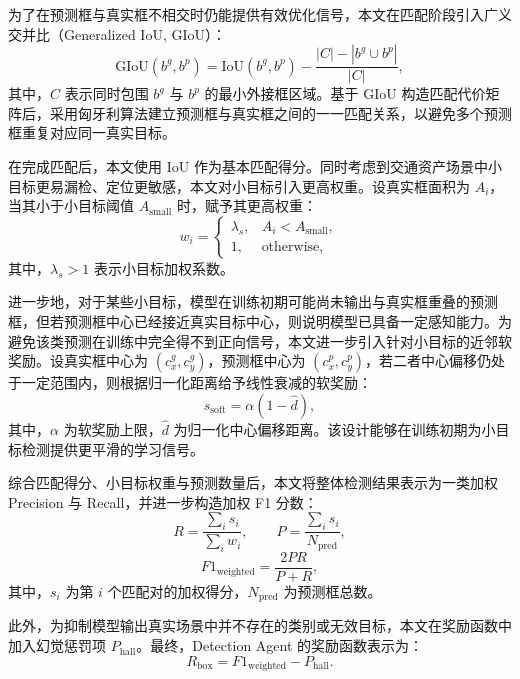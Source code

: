 为了在预测框与真实框不相交时仍能提供有效优化信号，本文在匹配阶段引入广义交并比（Generalized IoU, GIoU）：
\begin{equation}
\mathrm{GIoU}(b^g,b^p)
=
\mathrm{IoU}(b^g,b^p)
-
\frac{|C|-|b^g\cup b^p|}{|C|},
\label{eq:giou}
\end{equation}
其中，$C$ 表示同时包围 $b^g$ 与 $b^p$ 的最小外接框区域。基于 GIoU 构造匹配代价矩阵后，采用匈牙利算法建立预测框与真实框之间的一一匹配关系，以避免多个预测框重复对应同一真实目标。

在完成匹配后，本文使用 IoU 作为基本匹配得分。同时考虑到交通资产场景中小目标更易漏检、定位更敏感，本文对小目标引入更高权重。设真实框面积为 $A_i$，当其小于小目标阈值 $A_{\text{small}}$ 时，赋予其更高权重：
\begin{equation}
w_i=
\begin{cases}
\lambda_s, & A_i < A_{\text{small}},\\
1, & \text{otherwise},
\end{cases}
\label{eq:small_object_weight}
\end{equation}
其中，$\lambda_s > 1$ 表示小目标加权系数。

进一步地，对于某些小目标，模型在训练初期可能尚未输出与真实框重叠的预测框，但若预测框中心已经接近真实目标中心，则说明模型已具备一定感知能力。为避免该类预测在训练中完全得不到正向信号，本文进一步引入针对小目标的近邻软奖励。设真实框中心为 $(c_x^g,c_y^g)$，预测框中心为 $(c_x^p,c_y^p)$，若二者中心偏移仍处于一定范围内，则根据归一化距离给予线性衰减的软奖励：
\begin{equation}
s_{\text{soft}} = \alpha(1-\hat{d}),
\label{eq:soft_reward}
\end{equation}
其中，$\alpha$ 为软奖励上限，$\hat{d}$ 为归一化中心偏移距离。该设计能够在训练初期为小目标检测提供更平滑的学习信号。

综合匹配得分、小目标权重与预测数量后，本文将整体检测结果表示为一类加权 Precision 与 Recall，并进一步构造加权 F1 分数：
\begin{equation}
R = \frac{\sum_i s_i}{\sum_i w_i},
\qquad
P = \frac{\sum_i s_i}{N_{\text{pred}}},
\label{eq:weighted_pr}
\end{equation}
\begin{equation}
F1_{\text{weighted}}
=
\frac{2PR}{P+R},
\label{eq:weighted_f1}
\end{equation}
其中，$s_i$ 为第 $i$ 个匹配对的加权得分，$N_{\text{pred}}$ 为预测框总数。

此外，为抑制模型输出真实场景中并不存在的类别或无效目标，本文在奖励函数中加入幻觉惩罚项 $P_{\text{hall}}$。最终，Detection Agent 的奖励函数表示为：
\begin{equation}
R_{\text{box}} = F1_{\text{weighted}} - P_{\text{hall}}.
\label{eq:box_reward}
\end{equation}

